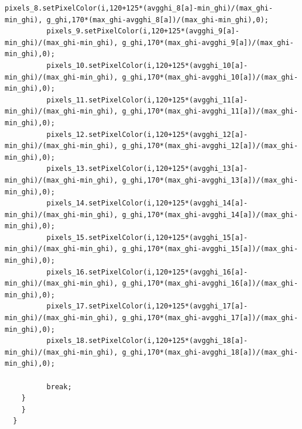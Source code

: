 \documentclass[a4paper,9pt]{article}
\begin{document}
\begin{lstlisting}[basicstyle=\tiny,style=CStyle]
          pixels_8.setPixelColor(i,120+125*(avgghi_8[a]-min_ghi)/(max_ghi-min_ghi), g_ghi,170*(max_ghi-avgghi_8[a])/(max_ghi-min_ghi),0);
          pixels_9.setPixelColor(i,120+125*(avgghi_9[a]-min_ghi)/(max_ghi-min_ghi), g_ghi,170*(max_ghi-avgghi_9[a])/(max_ghi-min_ghi),0);
          pixels_10.setPixelColor(i,120+125*(avgghi_10[a]-min_ghi)/(max_ghi-min_ghi), g_ghi,170*(max_ghi-avgghi_10[a])/(max_ghi-min_ghi),0);
          pixels_11.setPixelColor(i,120+125*(avgghi_11[a]-min_ghi)/(max_ghi-min_ghi), g_ghi,170*(max_ghi-avgghi_11[a])/(max_ghi-min_ghi),0);
          pixels_12.setPixelColor(i,120+125*(avgghi_12[a]-min_ghi)/(max_ghi-min_ghi), g_ghi,170*(max_ghi-avgghi_12[a])/(max_ghi-min_ghi),0);
          pixels_13.setPixelColor(i,120+125*(avgghi_13[a]-min_ghi)/(max_ghi-min_ghi), g_ghi,170*(max_ghi-avgghi_13[a])/(max_ghi-min_ghi),0);
          pixels_14.setPixelColor(i,120+125*(avgghi_14[a]-min_ghi)/(max_ghi-min_ghi), g_ghi,170*(max_ghi-avgghi_14[a])/(max_ghi-min_ghi),0);
          pixels_15.setPixelColor(i,120+125*(avgghi_15[a]-min_ghi)/(max_ghi-min_ghi), g_ghi,170*(max_ghi-avgghi_15[a])/(max_ghi-min_ghi),0);
          pixels_16.setPixelColor(i,120+125*(avgghi_16[a]-min_ghi)/(max_ghi-min_ghi), g_ghi,170*(max_ghi-avgghi_16[a])/(max_ghi-min_ghi),0);
          pixels_17.setPixelColor(i,120+125*(avgghi_17[a]-min_ghi)/(max_ghi-min_ghi), g_ghi,170*(max_ghi-avgghi_17[a])/(max_ghi-min_ghi),0);
          pixels_18.setPixelColor(i,120+125*(avgghi_18[a]-min_ghi)/(max_ghi-min_ghi), g_ghi,170*(max_ghi-avgghi_18[a])/(max_ghi-min_ghi),0);
        
          break;
    }
    }
  }


\end{lstlisting}
\end{document}
